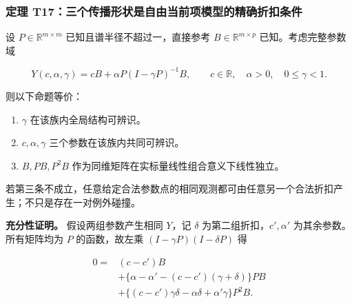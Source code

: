 \documentclass[11pt,a4paper]{article}
\providecommand{\tightlist}{\setlength{\itemsep}{0pt}\setlength{\parskip}{0pt}}
\begin{document}
\subsubsection{定理
T17：三个传播形状是自由当前项模型的精确折扣条件}\label{ux5b9aux7406-t17ux4e09ux4e2aux4f20ux64adux5f62ux72b6ux662fux81eaux7531ux5f53ux524dux9879ux6a21ux578bux7684ux7cbeux786eux6298ux6263ux6761ux4ef6}

\par
\noindent\begin{minipage}{\linewidth}

设 \(P\in\mathbb R^{m\times m}\) 已知且谱半径不超过一，直接参考
\(B\in\mathbb R^{m\times p}\) 已知。考虑完整参数域

\[
Y(c,\alpha,\gamma)
=cB+\alpha P(I-\gamma P)^{-1}B,
\qquad c\in\mathbb R,\quad\alpha>0,\quad0\le\gamma<1.
\]

\end{minipage}\par

则以下命题等价：

\begin{enumerate}
\def\labelenumi{\arabic{enumi}.}
\tightlist
\item
  \(\gamma\) 在该族内全局结构可辨识。
\item
  \(c,\alpha,\gamma\) 三个参数在该族内共同可辨识。
\item
  \(B,PB,P^2B\) 作为同维矩阵在实标量线性组合意义下线性独立。
\end{enumerate}

若第三条不成立，任意给定合法参数点的相同观测都可由任意另一个合法折扣产生；不只是存在一对例外碰撞。

\par
\noindent\begin{minipage}{\linewidth}

\textbf{充分性证明。} 假设两组参数产生相同 \(Y\)，记 \(\delta\)
为第二组折扣，\(c',\alpha'\) 为其余参数。所有矩阵均为 \(P\)
的函数，故左乘 \((I-\gamma P)(I-\delta P)\) 得

\[
\begin{aligned}
0={}&(c-c')B\\
&+\{\alpha-\alpha'-(c-c')(\gamma+\delta)\}PB\\
&+\{(c-c')\gamma\delta-\alpha\delta+\alpha'\gamma\}P^2B.
\end{aligned}
\]

\end{minipage}\par
\end{document}
